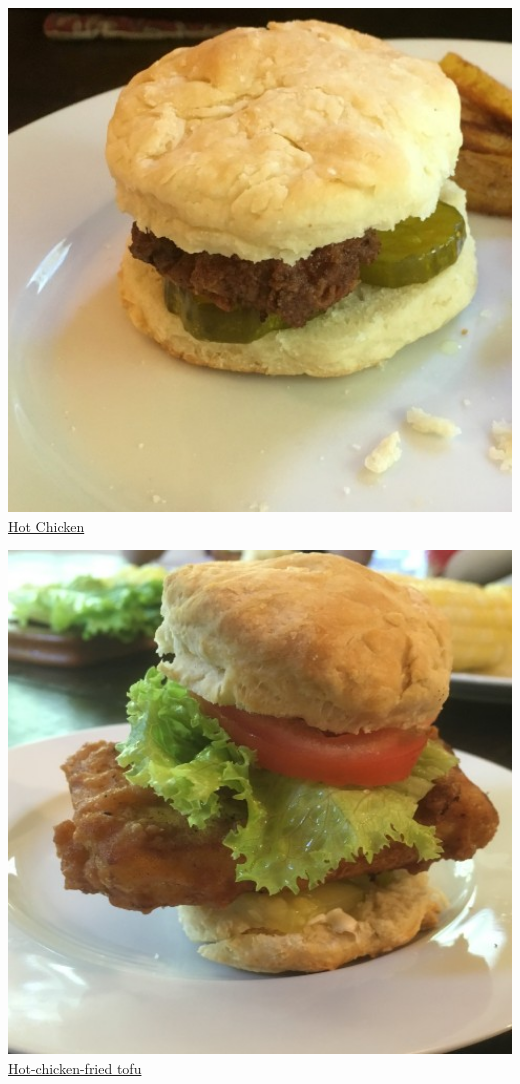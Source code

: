 \documentclass[
]{book}
\begin{document}
\protect\hyperlink{hotchicken}{\includegraphics[width=1\textwidth,height=\textheight]{hot_chicken_small.jpg}}
\protect\hyperlink{hotchicken}{Hot Chicken}

\protect\hyperlink{hottofu}{\includegraphics[width=1\textwidth,height=\textheight]{hot_chicken_tofu_small.jpg}}
\protect\hyperlink{hottofu}{Hot-chicken-fried tofu}
\end{document}
